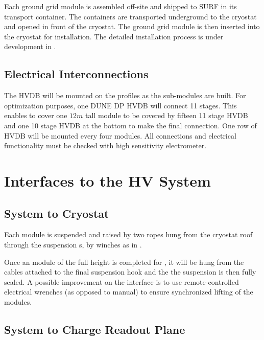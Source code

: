 Each ground grid module is assembled off-site and shipped to SURF in its transport container.   The containers are transported underground to the cryostat and opened in front of the cryostat.  The ground grid module is then inserted into the cryostat for installation. The detailed installation process is under development in .


\subsection{Electrical Interconnections}
\label{sec:fddp-prod-assy-elec-connec}

The HVDB will be mounted on the profiles as the sub-modules are built.  For optimization purposes, one DUNE DP HVDB will connect 11 stages.  This enables to cover one $12m$ tall module to be covered by fifteen 11 stage HVDB and one 10 stage HVDB at the bottom to make the final connection.   One row of HVDB will be mounted every four \fc modules.  All connections and electrical functionality must be checked with high sensitivity electrometer.


\section{Interfaces to the HV System}
\label{sec:fddp-hv-intfc}

\subsection{System to Cryostat}
\label{sec:fddp-hv-intfc-to-cryostat}

Each \fc module is suspended and raised by two ropes hung from the cryostat roof through the \fc suspension \fdth{}s, by winches as in .  

Once an \fc module of the full height is completed for , it will be hung 
from the cables attached to the final suspension hook and the  
 the suspension \fdth is then fully sealed. 
A possible improvement on the  interface is to use remote-controlled electrical wrenches (as opposed to manual) to ensure synchronized lifting of the modules.

\subsection{System to Charge Readout Plane}
\label{sec:fddp-hv-intfc-to-crp}

